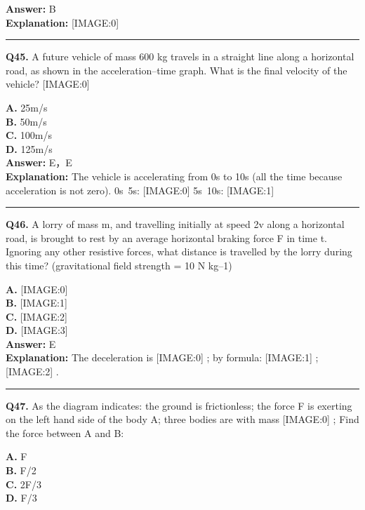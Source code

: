 \documentclass[12pt]{article}
\begin{document}
\textbf{Answer:} B \\
\textbf{Explanation:} [IMAGE:0]

\hrule
\vspace{1em}


\noindent
\textbf{Q45.} A future vehicle of mass 600 kg travels in a straight line along a horizontal road, as shown in the acceleration–time graph.
What is the final velocity of the vehicle?
[IMAGE:0]



\textbf{A.} 25m/s \\
\textbf{B.} 50m/s \\
\textbf{C.} 100m/s \\
\textbf{D.} 125m/s \\

\textbf{Answer:} E，E \\
\textbf{Explanation:} The vehicle is accelerating from 0s to 10s (all the time because acceleration is not zero).
0s~5s:
[IMAGE:0]
5s~10s:
[IMAGE:1]

\hrule
\vspace{1em}


\noindent
\textbf{Q46.} A lorry of mass m, and travelling initially at speed 2v along a horizontal road, is brought to rest by an average horizontal braking force F in time t. Ignoring any other resistive forces, what distance is travelled by the lorry during this time? (gravitational field strength = 10 N kg–1)



\textbf{A.} [IMAGE:0] \\
\textbf{B.} [IMAGE:1] \\
\textbf{C.} [IMAGE:2] \\
\textbf{D.} [IMAGE:3] \\

\textbf{Answer:} E \\
\textbf{Explanation:} The deceleration is
[IMAGE:0]
; by formula:
[IMAGE:1]
;
[IMAGE:2]
.

\hrule
\vspace{1em}


\noindent
\textbf{Q47.} As the diagram indicates: the ground is frictionless; the force
F
is exerting on the left hand side of the body A; three bodies are with mass
[IMAGE:0]
; Find the force between A and B:



\textbf{A.} F \\
\textbf{B.} F/2 \\
\textbf{C.} 2F/3 \\
\textbf{D.} F/3 \\
\end{document}
